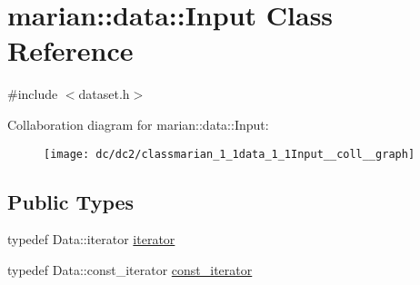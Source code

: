 \hypertarget{classmarian_1_1data_1_1Input}{}\section{marian\+:\+:data\+:\+:Input Class Reference}
\label{classmarian_1_1data_1_1Input}


{\ttfamily \#include $<$dataset.\+h$>$}



Collaboration diagram for marian\+:\+:data\+:\+:Input\+:
\nopagebreak
\begin{figure}[H]
\begin{center}
\leavevmode
\texttt{[image: dc/dc2/classmarian\_1\_1data\_1\_1Input\_\_coll\_\_graph]}
\end{center}
\end{figure}
\subsection*{Public Types}
\begin{DoxyCompactItemize}
\item 
typedef Data\+::iterator \hyperlink{classmarian_1_1data_1_1Input_a94a106c4c6881b4e3ad3796dbddfded2}{iterator}
\item 
typedef Data\+::const\+\_\+iterator \hyperlink{classmarian_1_1data_1_1Input_a3b3281863ff04a0d9f5af5e96ee42bb6}{const\+\_\+iterator}
\end{DoxyCompactItemize}
